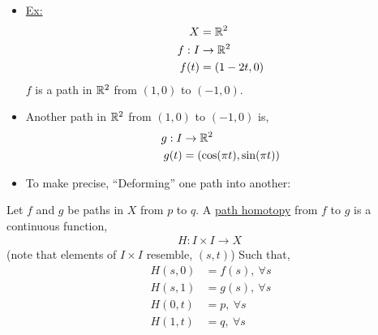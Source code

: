 \documentclass[../notes.tex]{subfiles}
\begin{document}
    \begin{itemize}
        \item \underline{Ex:}
            \begin{align*}
                X&=\mathbb{R}^2\\
                f: I &\rightarrow\mathbb{R}^2\\
                f(t)&=(1-2t,0)\\
            \end{align*}
            $f$ is a path in $\mathbb{R}^2$ from $(1,0)$ to $(-1,0)$.
        \item Another path in $\mathbb{R}^2$ from $(1,0)$ to $(-1,0)$ is,
            \begin{align*}
                g: I &\rightarrow \mathbb{R}^2\\
                g(t)&=(\cos(\pi t),\sin(\pi t))\\
            \end{align*}
        \item To make precise, ``Deforming'' one path into another:\\
            \begin{center}
            \end{center}
    \end{itemize}
        \begin{definition}
            Let $f$ and $g$ be paths in $X$ from $p$ to $q$. A \underline{path homotopy} from $f$ to $g$ is a continuous function,
            \begin{align*}
                H: I\times I \rightarrow X\
            \end{align*}
            (note that elements of $I\times I$ resemble, $(s,t)$)
            Such that,
            \begin{align*}
                H(s,0)&=f(s),\ \forall s\\
                H(s,1)&=g(s),\ \forall s\\
                H(0,t)&=p,\ \forall s\\
                H(1,t)&=q,\ \forall s\\
            \end{align*}
        \end{definition}
\end{document}
